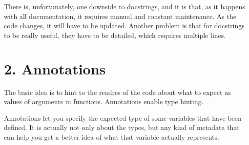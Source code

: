\documentclass[a4paper,10pt,english]{sphinxmanual}
\begin{document}
\begin{sphinxVerbatim}[commandchars=\\\{\}]
 

 
\end{sphinxVerbatim}

There is, unfortunately, one downside to docstrings, and it is that, as it happens with all documentation, it
requires manual and constant maintenance. As the code changes, it will have to be updated. Another problem is
that for docstrings to be really useful, they have to be detailed, which requires multiple lines.


\section{2. Annotations}
\label{\detokenize{chapters/1_docstrings_and_annotations/index:annotations}}
The basic idea is to hint to the readres of the code about what to expect as values of arguments in functions.
Annotations enable type hinting.

Annotations let you specify the expected type of some variables that have been defined. It is actually not
only about the types, but any kind of metadata that can help you get a better idea of what that variable
actually represents.

\begin{sphinxVerbatim}[commandchars=\\\{\}]
 
       
          
          

       
\end{sphinxVerbatim}
\end{document}

